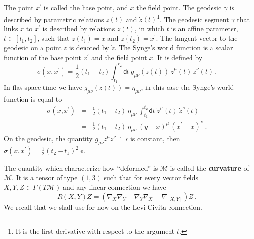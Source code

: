 \documentclass[12pt]{book}
\let\int\int
\newcommand{\Mcal}{\mathcal{M}}
\newcommand{\dsf}{\mathsf{d}}
\theoremstyle{break}
\begin{document}


The point $x^\prime$ is called the base point, and $x$ the field point. The geodesic $\gamma$ is described by parametric relations $z(t)$ and $\dot{z}(t)$\footnote{It is the first derivative with respect to the argument $t$.}.
The geodesic segment $\gamma$ that links $x$ to $x^\prime$ is described by relations $z(t)$, in which $t$ is an affine parameter, $t \in \left[ t_1 , t_2 \right]$, such that $z(t_1) = x$ and $z(t_2) = x^\prime$. The tangent vector to the geodesic on a point $z$ is denoted by $\dot{z}$. The Synge's world function is a scalar function of the base point $x^\prime$ and the field point $x$. It is defined by
%
\begin{equation*}
\sigma(x,x^\prime) =  \frac{1}{2} (t_1 - t_2) \int_{t_1}^{t_2} \dsf t \ g_{\mu \nu} \left( z(t) \right) \ \dot{z}^\mu(t) \ \dot{z}^{\nu}(t) \ .
\end{equation*}
%
In flat space time we have $g_{\mu \nu} \left( z(t) \right) = \eta_{\mu \nu}$, in this case the Synge's world function is equal to
%
\begin{eqnarray*}
\sigma(x,x^\prime) &=& \frac{1}{2} (t_1 - t_2) \ \eta_{\mu \nu} \ \int_{t_1}^{t_2} \dsf t \ \dot{z}^\mu(t) \ \dot{z}^{\nu}(t) \\
&=& \frac{1}{2} (t_1 - t_2) \ \eta_{\mu \nu} \ (y-x)^\mu \ (x^\prime-x)^\nu \ .
\end{eqnarray*}
%
On the geodesic, the quantity $g_{\mu \nu} \dot{z}^\mu \dot{z}^\nu \doteq \epsilon$ is constant, then $\sigma(x,x^\prime) = \frac{1}{2} (t_2-t_1)^2 \ \epsilon$.



The quantity which characterize how ``deformed'' is $\Mcal$ is called the \textbf{curvature} of $\Mcal$. It is a tensor of type $(1,3)$ such that for every vector fields $X, Y, Z \in \Gamma(T\Mcal)$ and any linear connection we have
%
\begin{equation*}
R(X,Y)Z = \left( \nabla_X \nabla_Y - \nabla_Y \nabla_X - \nabla_{[X,Y]} \right) Z \ .
\end{equation*}
%
We recall that we shall use for now on the Levi Civita connection. %
%
%
\end{document}
